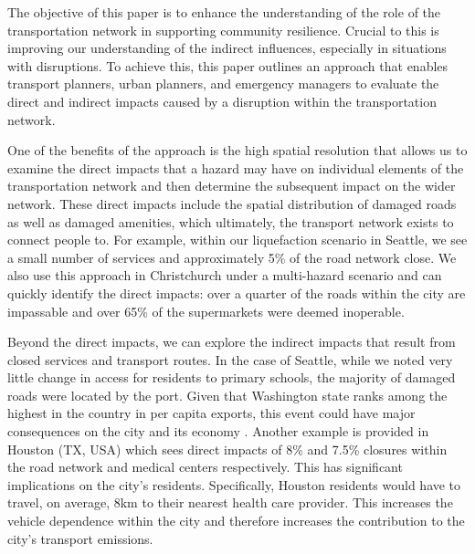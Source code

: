 \documentclass[review,3p,times,onecolumn,sort&compress,12pt]{elsarticle}
\let \cite \parencite
\begin{document}
The objective of this paper is to enhance the understanding of the role of the transportation network in supporting community resilience. 
Crucial to this is improving our understanding of the indirect influences, especially in situations with disruptions.
To achieve this, this paper outlines an approach that enables transport planners, urban planners, and emergency managers to evaluate the direct and indirect impacts caused by a disruption within the transportation network.

One of the benefits of the approach is the high spatial resolution that allows us to examine the direct impacts that a hazard may have on individual elements of the transportation network and then determine the subsequent impact on the wider network.
These direct impacts include the spatial distribution of damaged roads as well as damaged amenities, which ultimately, the transport network exists to connect people to.
For example, within our liquefaction scenario in Seattle, we see a small number of services and approximately 5\% of the road network close.
We also use this approach in Christchurch under a multi-hazard scenario and can quickly identify the direct impacts: over a quarter of the roads within the city are impassable and over 65\% of the supermarkets were deemed inoperable.

Beyond the direct impacts, we can explore the indirect impacts that result from closed services and transport routes.
In the case of Seattle, while we noted very little change in access for residents to primary schools, the majority of damaged roads were located by the port.
Given that Washington state ranks among the highest in the country in per capita exports, this event could have major consequences on the city and its economy \cite{McNamee2016-ms}.
Another example is provided in Houston (TX, USA) which sees direct impacts of 8\% and 7.5\% closures within the road network and medical centers respectively.
This has significant implications on the city's residents.
Specifically, Houston residents would have to travel, on average, 8km to their nearest health care provider.
This increases the vehicle dependence within the city and therefore increases the contribution to the city's transport emissions.
\end{document}
